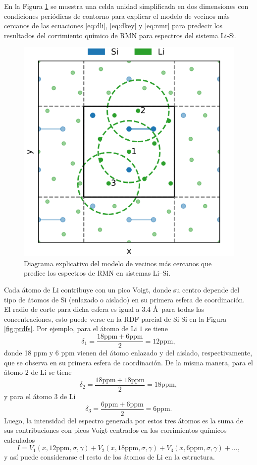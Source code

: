 En la Figura \ref{fig:viz} se muestra una celda unidad simplificada en dos
dimensiones con condiciones periódicas de contorno para explicar el modelo
de vecinos más cercanos de las ecuaciones \ref{eq:dli}, \ref{eq:dkey} y \ref{eq:nmr}
para predecir los resultados del corrimiento químico de RMN para espectros 
del sistema Li-Si.
\begin{figure}[h!]
    \centering
    \includegraphics[width=.5\textwidth]{Silicio/prediccion/resultados/nmr/viz.png}
    \caption{Diagrama explicativo del modelo de vecinos más cercanos que predice los
    espectros de RMN en sistemas Li--Si.} 
    \label{fig:viz}
\end{figure}
Cada átomo de Li contribuye con un pico Voigt, donde su centro
depende del tipo de átomos de Si (enlazado o aislado) en su primera esfera de 
coordinación. El radio de corte para dicha esfera es igual a 3.4 \AA\ para todas 
las concentraciones, esto puede verse en la RDF parcial de Si-Si en la Figura 
\ref{fig:prdfs}. Por ejemplo, para el átomo de Li $1$ se tiene
\begin{equation}
    \delta_1 = \frac{18 \text{ppm} + 6 \text{ppm}}{2} = 12 \text{ppm},
\end{equation}
donde 18 ppm y 6 ppm vienen del átomo enlazado y del aislado, respectivamente,
que se observa en su primera esfera de coordinación. De la misma manera, para 
el átomo $2$ de Li se tiene 
\begin{equation}
    \delta_2 = \frac{18 \text{ppm} + 18 \text{ppm}}{2} = 18 \text{ppm},
\end{equation}
y para el átomo $3$ de Li
\begin{equation}
    \delta_3 = \frac{6 \text{ppm} + 6 \text{ppm}}{2} = 6 \text{ppm}.
\end{equation}
Luego, la intensidad del espectro generada por estos tres átomos es la suma
de sus contribuciones con picos Voigt centrados en los corrimientos químicos
calculados
\begin{equation}
    I = V_1(x, 12 \text{ppm}, \sigma, \gamma) + V_2(x, 18 \text{ppm}, \sigma, \gamma) + V_3(x, 6 \text{ppm}, \sigma, \gamma) + ...,
\end{equation}
y así puede considerarse el resto de los átomos de Li en la estructura.

